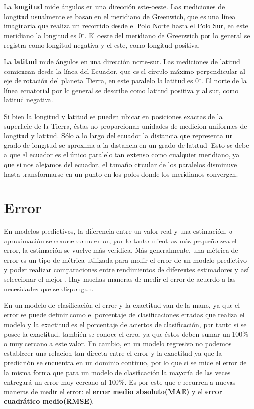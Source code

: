     La \textbf{longitud} mide ángulos en una dirección este-oeste. Las mediciones de longitud usualmente se basan en el meridiano de Greenwich, que es una línea
    imaginaria que realiza un recorrido desde el Polo Norte hasta el Polo Sur, en este meridiano la longitud es 0$^{\circ}$. El oeste del meridiano de Greenwich por lo general 
    se registra como longitud negativa y el este, como longitud positiva.

    La \textbf{latitud} mide ángulos en una dirección norte-sur. Las mediciones de latitud comienzan desde la línea del Ecuador, que es el círculo máximo perpendicular
    al eje de rotación del planeta Tierra, en este paralelo la latitud es 0$^{\circ}$. El norte de la línea ecuatorial por lo general 
    se describe como latitud positiva y al sur, como latitud negativa.

    Si bien la longitud y latitud se pueden ubicar en posiciones exactas de la superficie de la Tierra, éstas no proporcionan
    unidades de medicion uniformes de longitud y latitud. Sólo a lo largo del ecuador la distancia que representa un grado de longitud se aproxima a la distancia
    en un grado de latitud. Esto se debe a que el ecuador es el único paralelo tan extenso como cualquier meridiano, ya que si nos alejamos del ecuador, el tamaño circular de
    los paralelos disminuye hasta transformarse en un punto en los polos donde los meridianos convergen.
%    
%
%
%
\section{Error}
En modelos predictivos, la diferencia entre un valor real y una estimación, o aproximación se conoce como error, por lo tanto mientras más pequeño sea el error,
la estimación se vuelve más verídica. Más generalmente, una métrica de error es un tipo de métrica utilizada para medir el error de un modelo predictivo y poder
realizar comparaciones entre rendimientos de diferentes estimadores y así seleccionar el mejor .
Hay muchas maneras de medir el error de acuerdo a las necesidades que se dispongan.


En un modelo de clasificación el error y la exactitud van de la mano, ya que el error se puede definir como el porcentaje de clasificaciones erradas que realiza el modelo 
y la exactitud es el porcentaje de aciertos de clasificación, por tanto si se posee la exactitud, también se conoce el error ya que éstos deben sumar un 100\% o muy cercano a este valor.
En cambio, en un modelo regresivo no podemos establecer una relacion tan directa entre el error y la exactitud ya que la predicción se encuentra en un dominio continuo, por lo que si se mide el 
error de la misma forma que para un modelo de clasificación la mayoría de las veces entregará un error muy cercano al 100\%. Es por esto que e recurren a nuevas maneras de medir el error: 
el \textbf{error medio absoluto(MAE)} y el \textbf{error cuadrático medio(RMSE)}.

